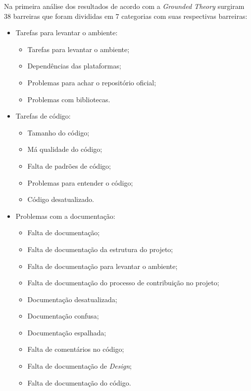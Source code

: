 Na primeira análise dos resultados de acordo com a \textit{Grounded Theory} surgiram 
38 barreiras que foram divididas em 7 categorias com suas respectivas barreiras:

\begin{itemize}

\item Tarefas para levantar o ambiente: 

	\begin{itemize}
	\item Tarefas para levantar o ambiente; 
	\item Dependências das plataformas;
	\item Problemas para achar o repositório oficial;
	\item Problemas com bibliotecas.
	\end{itemize}

\item Tarefas de código:
	
	\begin{itemize}
	\item Tamanho do código;
	\item Má qualidade do código;
	\item Falta de padrões de código;
	\item Problemas para entender o código;
	\item Código desatualizado.
	\end{itemize}

\item Problemas com a documentação:

	\begin{itemize}
	\item Falta de documentação;
	\item Falta de documentação da estrutura do projeto;
	\item Falta de documentação para levantar o ambiente;
	\item Falta de documentação do processo de contribuição no projeto;
	\item Documentação desatualizada;
	\item Documentação confusa;
	\item Documentação espalhada;
	\item Falta de comentários no código;
	\item Falta de documentação de \textit{Design};
	\item Falta de documentação do código.
	\end{itemize}


\end{itemize}
